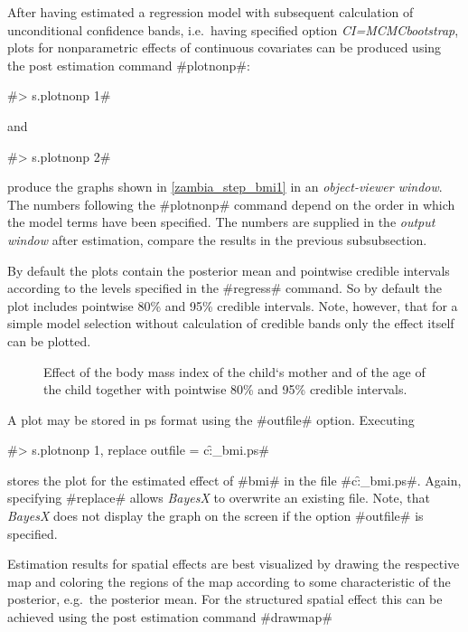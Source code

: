 \documentclass[11pt,a4paper,twoside]{bayesxreport}
\begin{document}
After having estimated a regression model with subsequent
calculation of unconditional confidence bands, i.e.~having specified
option {\it CI=MCMCbootstrap}, plots for nonparametric effects of
continuous covariates can be produced using the post estimation
command #plotnonp#:

#> s.plotnonp 1#

and

#> s.plotnonp 2#

produce the graphs shown in \autoref{zambia_step_bmi1} in an {\it
object-viewer window}. The numbers following the #plotnonp# command
depend on the order in which the model terms have been specified.
The numbers are supplied in the {\em output window} after
estimation, compare the results in the previous subsubsection.

By default the plots contain the posterior mean and pointwise
credible intervals according to the levels specified in the
#regress# command. So by default the plot includes pointwise 80\%
and 95\% credible intervals. Note, however, that for a simple model
selection without calculation of credible bands only the effect
itself can be plotted.

\begin{figure}[ht]
\begin{center}
{\it\caption{Effect of the body mass index of the child`s mother and
of the age of the child together with pointwise 80\% and 95\%
credible intervals. \label{zambia_step_bmi1}}}
\end{center}
\end{figure}

A plot may be stored in ps format using the #outfile# option.
Executing

#> s.plotnonp 1, replace outfile = c:\data\f_bmi.ps#

stores the plot for the estimated effect of #bmi# in the file
#c:\data\f_bmi.ps#. Again, specifying #replace# allows {\it BayesX}
to overwrite an existing file. Note, that {\it BayesX} does not
display the graph on the screen if the option #outfile# is
specified.

Estimation results for spatial effects are best visualized by
drawing the respective map and coloring the regions of the map
according to some characteristic of the posterior, e.g.~the
posterior mean. For the structured spatial effect this can be
achieved using the post estimation command #drawmap#
\end{document}
